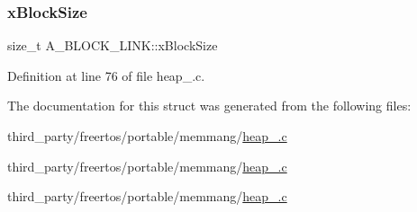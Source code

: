 \mbox{\label{structA__BLOCK__LINK_ad5dcf5df03d8be6186c567be9e2c657b}} 
\subsubsection{\texorpdfstring{x\+Block\+Size}{xBlockSize}}
{\footnotesize\ttfamily size\+\_\+t A\+\_\+\+B\+L\+O\+C\+K\+\_\+\+L\+I\+N\+K\+::x\+Block\+Size}



Definition at line 76 of file heap\+\_.\+c.



The documentation for this struct was generated from the following files\+:\begin{DoxyCompactItemize}
\item 
third\+\_\+party/freertos/portable/memmang/\hyperlink{heap__2_8c}{heap\+\_.\+c}\item 
third\+\_\+party/freertos/portable/memmang/\hyperlink{heap__4_8c}{heap\+\_.\+c}\item 
third\+\_\+party/freertos/portable/memmang/\hyperlink{heap__5_8c}{heap\+\_.\+c}\end{DoxyCompactItemize}
